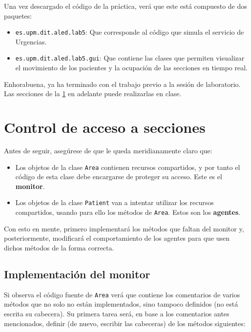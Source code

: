 \documentclass[10pt,a4paper,spanish]{article}
\newcommand{\code}[1]{\texttt{#1}}
\begin{document}
Una vez descargado el código de la práctica, verá que este está compuesto de dos paquetes:

\begin{itemize}
    \item \code{es.upm.dit.aled.lab5}: Que corresponde al código que simula el servicio de Urgencias.
    \item \code{es.upm.dit.aled.lab5.gui}: Que contiene las clases que permiten visualizar el movimiento de los pacientes y la ocupación de las secciones en tiempo real.
\end{itemize}

Enhorabuena, ya ha terminado con el trabajo previo a la sesión de laboratorio. Las secciones de la \ref{sec:laboratorio} en adelante puede realizarlas en clase.

\section{Control de acceso a secciones}
\label{sec:laboratorio}

Antes de seguir, asegúrese de que le queda meridianamente claro que:

\begin{itemize}
    \item Los objetos de la clase \code{Area} contienen recursos compartidos, y por tanto el código de esta clase debe encargarse de proteger su acceso. Este es el \textbf{monitor}.
    \item Los objetos de la clase \code{Patient} van a intentar utilizar los recursos compartidos, usando para ello los métodos de \code{Area}. Estos son los \textbf{agentes}.
\end{itemize}

Con esto en mente, primero implementará los métodos que faltan del monitor y, posteriormente, modificará el comportamiento de los agentes para que usen dichos métodos de la forma correcta.

\subsection{Implementación del monitor}

Si observa el código fuente de \code{Area} verá que contiene los comentarios de varios métodos que no solo no están implementados, sino tampoco definidos (no está escrita su cabecera). Su primera tarea será, en base a los comentarios antes mencionados, definir (de nuevo, escribir las cabeceras) de los métodos siguientes:
\end{document}
